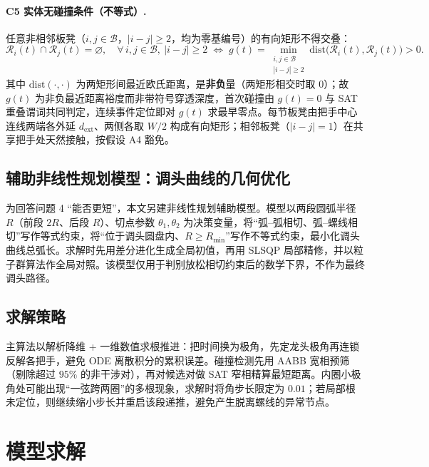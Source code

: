 \documentclass[a4paper, 12pt]{ctexart}
\begin{document}
\paragraph{C5 实体无碰撞条件（不等式）.} 任意非相邻板凳（$i,j\in\mathcal{B}$，$|i-j|\ge2$，均为零基编号）的有向矩形不得交叠：
\begin{equation}
\mathcal{R}_i(t)\cap\mathcal{R}_j(t)=\varnothing,\quad \forall\,i,j\in\mathcal{B},\ |i-j|\ge2
\;\Longleftrightarrow\;
g(t)=\min_{\substack{i,j\in\mathcal{B}\\ |i-j|\ge2}}\mathrm{dist}\big(\mathcal{R}_i(t),\mathcal{R}_j(t)\big)>0.
\label{eq:c5}
\end{equation}
其中 $\mathrm{dist}(\cdot,\cdot)$ 为两矩形间最近欧氏距离，是\textbf{非负}量（两矩形相交时取 $0$）；故 $g(t)$ 为非负最近距离裕度而非带符号穿透深度，首次碰撞由 $g(t)=0$ 与 SAT 重叠谓词共同判定，连续事件定位即对 $g(t)$ 求最早零点。每节板凳由把手中心连线两端各外延 $d_{\text{ext}}$、两侧各取 $W/2$ 构成有向矩形\cite{deberg2008compgeom}；相邻板凳（$|i-j|=1$）在共享把手处天然接触，按假设 A4 豁免。

\subsection{辅助非线性规划模型：调头曲线的几何优化}
\label{sec:aux_nlp}

为回答问题 4 “能否更短”，本文另建非线性规划辅助模型。模型以两段圆弧半径 $R$（前段 $2R$、后段 $R$）、切点参数 $\theta_1,\theta_2$ 为决策变量，将“弧--弧相切、弧--螺线相切”写作等式约束，将“位于调头圆盘内、$R\ge R_{\min}$”写作不等式约束，最小化调头曲线总弧长\cite{nocedal2006numerical,boyd2004convex}。求解时先用差分进化生成全局初值，再用 SLSQP 局部精修，并以粒子群算法作全局对照\cite{kennedy1995particle,shi1998modified}。该模型仅用于判别放松相切约束后的数学下界，不作为最终调头路径。

\subsection{求解策略}

主算法以解析降维 + 一维数值求根推进：把时间换为极角，先定龙头极角再连锁反解各把手，避免 ODE 离散积分的累积误差。碰撞检测先用 AABB 宽相预筛（剔除超过 $95\%$ 的非干涉对），再对候选对做 SAT 窄相精算最短距离\cite{ericson2004realtime}。内圈小极角处可能出现“一弦跨两圈”的多根现象，求解时将角步长限定为 $0.01$；若局部根未定位，则继续缩小步长并重启该段递推，避免产生脱离螺线的异常节点。

\section{模型求解}
\end{document}
